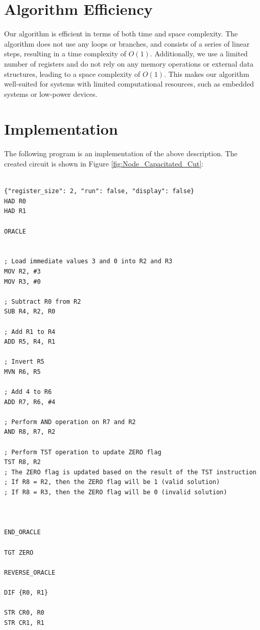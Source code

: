 \section{Algorithm Efficiency}

Our algorithm is efficient in terms of both time and space complexity. The algorithm does not use any loops or branches, and consists of a series of linear steps, resulting in a time complexity of $O(1)$. Additionally, we use a limited number of registers and do not rely on any memory operations or external data structures, leading to a space complexity of $O(1)$. This makes our algorithm well-suited for systems with limited computational resources, such as embedded systems or low-power devices.



\section{Implementation}

The following program is an implementation of the above description. The created circuit is shown in Figure \ref{fig:Node_Capacitated_Cut}:

\begin{lstlisting}

{"register_size": 2, "run": false, "display": false}
HAD R0
HAD R1

ORACLE


; Load immediate values 3 and 0 into R2 and R3
MOV R2, #3
MOV R3, #0

; Subtract R0 from R2
SUB R4, R2, R0

; Add R1 to R4
ADD R5, R4, R1

; Invert R5
MVN R6, R5

; Add 4 to R6
ADD R7, R6, #4

; Perform AND operation on R7 and R2
AND R8, R7, R2

; Perform TST operation to update ZERO flag
TST R8, R2
; The ZERO flag is updated based on the result of the TST instruction
; If R8 = R2, then the ZERO flag will be 1 (valid solution)
; If R8 = R3, then the ZERO flag will be 0 (invalid solution)



END_ORACLE

TGT ZERO

REVERSE_ORACLE

DIF {R0, R1}

STR CR0, R0
STR CR1, R1


\end{lstlisting}

